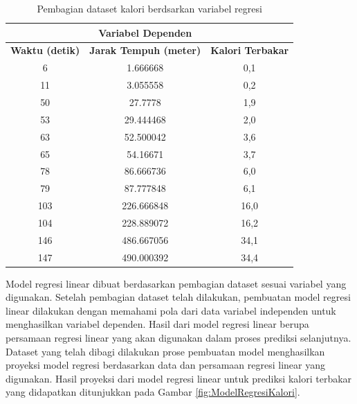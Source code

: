 \begin{longtable}{|c|c|c|}
  \caption{Pembagian dataset kalori berdsarkan variabel regresi}
  \label{tb:VariabelPrediksiKalori}                                   \\
  \hline
  \rowcolor[HTML]{C0C0C0}
  \multicolumn{2}{|c|}{\textbf{Variabel Independen}}  & \textbf{Variabel Dependen}  \\
  \hline
  \rowcolor[HTML]{C0C0C0}
  \textbf{Waktu (detik)} & \textbf{Jarak Tempuh (meter)} & \textbf{Kalori Terbakar} \\
  \hline
  6    & 1.666668    & 0,1     \\
  \hline
  11    & 3.055558    & 0,2     \\
  \hline
  50    & 27.7778    & 1,9     \\
  \hline
  53    & 29.444468    & 2,0     \\
  \hline
  63    & 52.500042    & 3,6     \\
  \hline
  65    & 54.16671    & 3,7     \\
  \hline
  78    & 86.666736    & 6,0     \\
  \hline
  79    & 87.777848    & 6,1     \\
  \hline
  103    & 226.666848    & 16,0     \\
  \hline
  104    & 228.889072    & 16,2     \\
  \hline
  146    & 486.667056    & 34,1     \\
  \hline
  147    & 490.000392    & 34,4     \\
  \hline
\end{longtable}

Model regresi linear dibuat berdasarkan pembagian dataset sesuai variabel yang digunakan. Setelah pembagian dataset telah dilakukan, pembuatan model regresi linear dilakukan dengan memahami pola dari data variabel independen untuk menghasilkan variabel dependen. Hasil dari model regresi linear berupa persamaan regresi linear yang akan digunakan dalam proses prediksi selanjutnya. Dataset yang telah dibagi dilakukan prose pembuatan model menghasilkan proyeksi model regresi berdasarkan data dan persamaan regresi linear yang digunakan. Hasil proyeksi dari model regresi linear untuk prediksi kalori terbakar yang didapatkan ditunjukkan pada Gambar \ref{fig:ModelRegresiKalori}.

